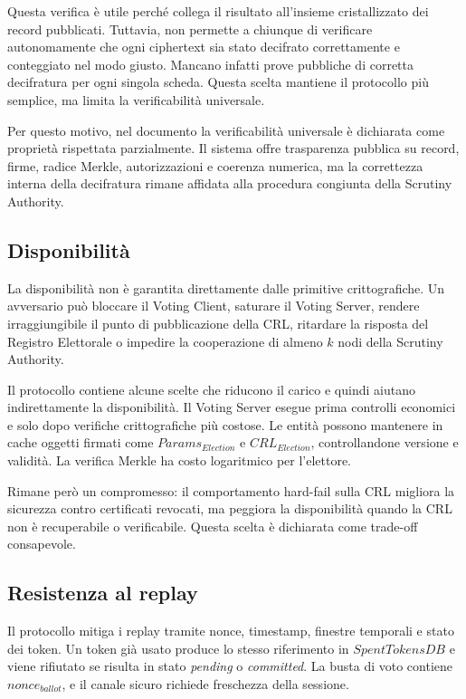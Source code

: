 \documentclass[a4paper,12pt]{article}
\begin{document}
Questa verifica è utile perché collega il risultato all'insieme cristallizzato dei record pubblicati.
Tuttavia, non permette a chiunque di verificare autonomamente che ogni ciphertext sia stato decifrato correttamente e conteggiato nel modo giusto.
Mancano infatti prove pubbliche di corretta decifratura per ogni singola scheda. Questa scelta mantiene il protocollo più semplice, ma limita la verificabilità universale.

Per questo motivo, nel documento la verificabilità universale è dichiarata come proprietà rispettata parzialmente.
Il sistema offre trasparenza pubblica su record, firme, radice Merkle, autorizzazioni e coerenza numerica, ma la correttezza interna della decifratura rimane affidata alla procedura congiunta della Scrutiny Authority.

\subsection{Disponibilità}

La disponibilità non è garantita direttamente dalle primitive crittografiche.
Un avversario può bloccare il Voting Client, saturare il Voting Server, rendere irraggiungibile il punto di pubblicazione della CRL, ritardare la risposta del Registro Elettorale o impedire la cooperazione di almeno \(k\) nodi della Scrutiny Authority.

Il protocollo contiene alcune scelte che riducono il carico e quindi aiutano indirettamente la disponibilità.
Il Voting Server esegue prima controlli economici e solo dopo verifiche crittografiche più costose.
Le entità possono mantenere in cache oggetti firmati come \(Params_{Election}\) e \(CRL_{Election}\), controllandone versione e validità.
La verifica Merkle ha costo logaritmico per l'elettore.

Rimane però un compromesso: il comportamento hard-fail sulla CRL migliora la sicurezza contro certificati revocati, ma peggiora la disponibilità quando la CRL non è recuperabile o verificabile.
Questa scelta è dichiarata come trade-off consapevole.

\subsection{Resistenza al replay}

Il protocollo mitiga i replay tramite nonce, timestamp, finestre temporali e stato dei token.
Un token già usato produce lo stesso riferimento in \(SpentTokensDB\) e viene rifiutato se risulta in stato \emph{pending} o \emph{committed}.
La busta di voto contiene \(nonce_{ballot}\), e il canale sicuro richiede freschezza della sessione.
\end{document}
